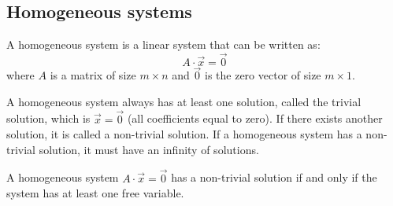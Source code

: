 \subsection{Homogeneous systems}
\begin{definition}
    A homogeneous system is a linear system that can be written as:
    \[
        A \cdot \vec{x} = \vec{0}
    \]
    where $A$ is a matrix of size $m \times n$ and $\vec{0}$ is the zero vector of size $m \times 1$.
\end{definition}
A homogeneous system always has at least one solution, called the trivial solution, which is $\vec{x} = \vec{0}$ (all coefficients equal to zero). If there exists another solution, it is called a non-trivial solution. If a homogeneous system has a non-trivial solution, it must have an infinity of solutions.
\begin{theorem}
    A homogeneous system $A \cdot \vec{x} = \vec{0}$ has a non-trivial solution if and only if the system has at least one free variable.
\end{theorem}


